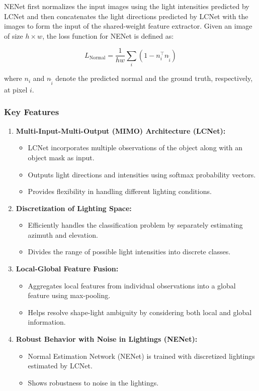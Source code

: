 NENet first normalizes the input images using the light intensities predicted by LCNet and then concatenates the light directions predicted by LCNet with the images to form the input of the shared-weight feature extractor. Given an image of size $h \times w$, the loss function for NENet is defined as:

\[ L_{\text{Normal}} = \frac{1}{hw} \sum_{i} (1 - n_i^\top n_{\tilde{i}}) \]

where $n_i$ and $n_{\tilde{i}}$ denote the predicted normal and the ground truth, respectively, at pixel $i$.


\subsubsection{Key Features}

\begin{enumerate}
    \item \textbf{Multi-Input-Multi-Output (MIMO) Architecture (LCNet):}
    \begin{itemize}
        \item LCNet incorporates multiple observations of the object along with an object mask as input.
        \item Outputs light directions and intensities using softmax probability vectors.
        \item Provides flexibility in handling different lighting conditions.
    \end{itemize}
    
    \item \textbf{Discretization of Lighting Space:}
    \begin{itemize}
        \item Efficiently handles the classification problem by separately estimating azimuth and elevation.
        \item Divides the range of possible light intensities into discrete classes.
    \end{itemize}
    
    \item \textbf{Local-Global Feature Fusion:}
    \begin{itemize}
        \item Aggregates local features from individual observations into a global feature using max-pooling.
        \item Helps resolve shape-light ambiguity by considering both local and global information.
    \end{itemize}
    
    \item \textbf{Robust Behavior with Noise in Lightings (NENet):}
    \begin{itemize}
        \item Normal Estimation Network (NENet) is trained with discretized lightings estimated by LCNet.
        \item Shows robustness to noise in the lightings.
    \end{itemize}
\end{enumerate}

